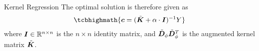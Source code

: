 \begin{frame}{Kernel Regression}
The optimal solution is therefore given as
\begin{align*}
    \tcbhighmath{
    \bc = (\abK + \alpha \cdot \bI)^{-1} Y}
\end{align*}
where ${\boldsymbol I} \in {\mathord{\mathbb R}}^{n\times n}$ is the $n \times n$ identity matrix,
and $\tilde{{\boldsymbol D}}_\phi \tilde{{\boldsymbol D}}_\phi^T$ is the augmented kernel matrix $\tilde{{\boldsymbol K}}$.%
%
\end{frame}


